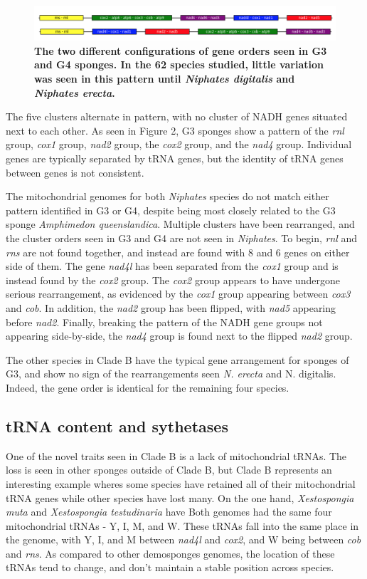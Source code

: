 \documentclass[../main.tex]{subfiles}
\begin{document}
\begin{figure}[htp]
    \centering
    \includegraphics[width=1.0\textwidth]{Figures/figure 2.png}
    \caption{\textbf{The two different configurations of gene orders seen in G3 and G4 sponges. In the 62 species studied, little variation was seen in this pattern until \emph{Niphates digitalis} and \emph{Niphates erecta}.}}
\end{figure}

The five clusters alternate in pattern, with no cluster of NADH genes situated next to each other. As seen in Figure 2, G3 sponges show a pattern of the \emph{rnl} group, \emph{cox1} group, \emph{nad2} group, the \emph{cox2} group, and the \emph{nad4} group. Individual genes are typically separated by tRNA genes, but the identity of tRNA genes between genes is not consistent. 

The mitochondrial genomes for both \emph{Niphates} species do not match either pattern identified in G3 or G4, despite being most closely related to the G3 sponge \emph{Amphimedon queenslandica}. Multiple clusters have been rearranged, and the cluster orders seen in G3 and G4 are not seen in \emph{Niphates}. To begin, \emph{rnl} and \emph {rns} are not found together, and instead are found with 8 and 6 genes on either side of them. The gene \emph{nad4l} has been separated from the \emph{cox1} group and is instead found by the \emph{cox2} group. The \emph{cox2} group appears to have undergone serious rearrangement, as evidenced by the \emph{cox1} group appearing between \emph{cox3} and \emph{cob}. In addition, the \emph{nad2} group has been flipped, with \emph{nad5} appearing before \emph{nad2}. Finally, breaking the pattern of the NADH gene groups not appearing side-by-side, the \emph{nad4} group is found next to the flipped \emph{nad2} group. 

The other species in Clade B have the typical gene arrangement for sponges of G3, and show no sign of the rearrangements seen \emph{N. erecta} and {N. digitalis}. Indeed, the gene order is identical for the remaining four species.

\subsection{tRNA content and sythetases}
One of the novel traits seen in Clade B is a lack of mitochondrial tRNAs. The loss is seen in other sponges outside of Clade B, but Clade B represents an interesting example wheres some species have retained all of their mitochondrial tRNA genes while other species have lost many. On the one hand, \emph{Xestospongia muta} and \emph{Xestospongia testudinaria} have Both genomes had the same four mitochondrial tRNAs - Y, I, M, and W. These tRNAs fall into the same place in the genome, with Y, I, and M between \emph{nad4l} and \emph{cox2}, and W being between \emph{cob} and \emph{rns}. As compared to other demosponges genomes, the location of these tRNAs tend to change, and don't maintain a stable position across species.
\end{document}
